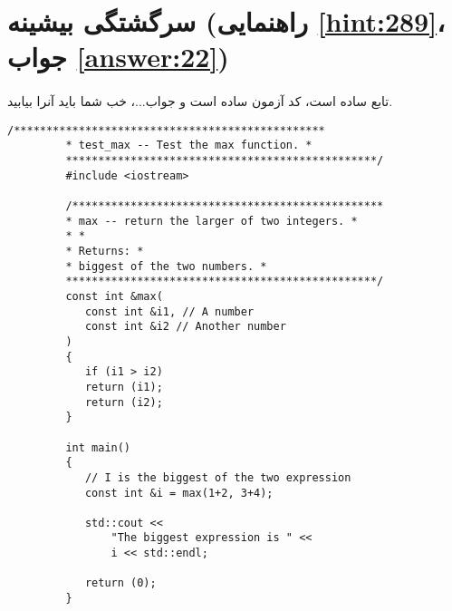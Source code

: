 \section[سرگشتگی بیشینه]{سرگشتگی بیشینه \protect{} (راهنمایی \ref{hint:289}، جواب \ref{answer:22})}
\paragraph{}\label{prog:53}
تابع  ساده است، کد آزمون ساده است و جواب...، خب شما باید آنرا بیابید.

\begin{LTR}
    \begin{lstlisting}[style=C++Style]
         /************************************************
         * test_max -- Test the max function. *
         ************************************************/
         #include <iostream>

         /************************************************
         * max -- return the larger of two integers. *
         * *
         * Returns: *
         * biggest of the two numbers. *
         ************************************************/
         const int &max(
         	const int &i1, // A number
         	const int &i2 // Another number
         )
         {
         	if (i1 > i2)
         	return (i1);
         	return (i2);
         }

         int main()
         {
         	// I is the biggest of the two expression
         	const int &i = max(1+2, 3+4);

         	std::cout <<
         		"The biggest expression is " <<
         		i << std::endl;

         	return (0);
         }
    \end{lstlisting}
\end{LTR}